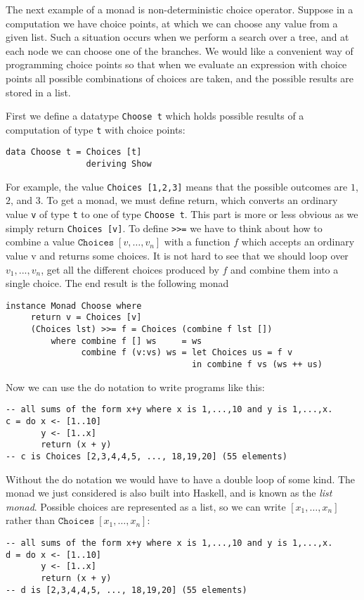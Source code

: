 \documentclass[a4paper,10pt]{article}
\newcommand{\cc}[1]{\lstinline{#1}}
\begin{document}
The next example of a monad is non-deterministic choice operator. Suppose in a
computation we have choice points, at which we can choose any value from a
given list. Such a situation occurs when we perform a search over a tree, and
at each node we can choose one of the branches. We would like a convenient way
of programming choice points so that when we evaluate an expression with
choice points all possible combinations of choices are taken, and the possible
results are stored in a list.

First we define a datatype \cc{Choose t} which holds possible results of a
computation of type \cc{t} with choice points:
% 
\begin{lstlisting}
data Choose t = Choices [t]
                deriving Show
\end{lstlisting}
% 
For example, the value \cc{Choices [1,2,3]} means that the possible outcomes
are $1$, $2$, and $3$. To get a monad, we must define return, which converts
an ordinary value \cc{v} of type \cc{t} to one of type \cc{Choose t}. This
part is more or less obvious as we simply return \cc{Choices [v]}.
% 
To define \cc{>>=} we have to think about how to combine a value
$\mathtt{Choices}\;[v, \ldots, v_n]$ with a function $f$ which accepts an
ordinary value v and returns some choices. It is not hard to see that we
should loop over $v_1, ..., v_n$, get all the different choices produced by
$f$ and combine them into a single choice. The end result is the following
monad
% 
\begin{lstlisting}
instance Monad Choose where
     return v = Choices [v]
     (Choices lst) >>= f = Choices (combine f lst [])
         where combine f [] ws     = ws
               combine f (v:vs) ws = let Choices us = f v
                                     in combine f vs (ws ++ us)
\end{lstlisting}
% 
Now we can use the do notation to write programs like this:
% 
\begin{lstlisting}
-- all sums of the form x+y where x is 1,...,10 and y is 1,...,x.
c = do x <- [1..10]
       y <- [1..x]
       return (x + y)
-- c is Choices [2,3,4,4,5, ..., 18,19,20] (55 elements)
\end{lstlisting}
% 
Without the do notation we would have to have a double loop of some kind. The
monad we just considered is also built into Haskell, and is known as the
\emph{list monad}. Possible choices are represented as a list, so we can write
$[x_1, \ldots, x_n]$ rather than $\mathtt{Choices}\; [x_1, \ldots, x_n]$:
% 
\begin{lstlisting}
-- all sums of the form x+y where x is 1,...,10 and y is 1,...,x.
d = do x <- [1..10]
       y <- [1..x]
       return (x + y)
-- d is [2,3,4,4,5, ..., 18,19,20] (55 elements)
\end{lstlisting}
\end{document}
